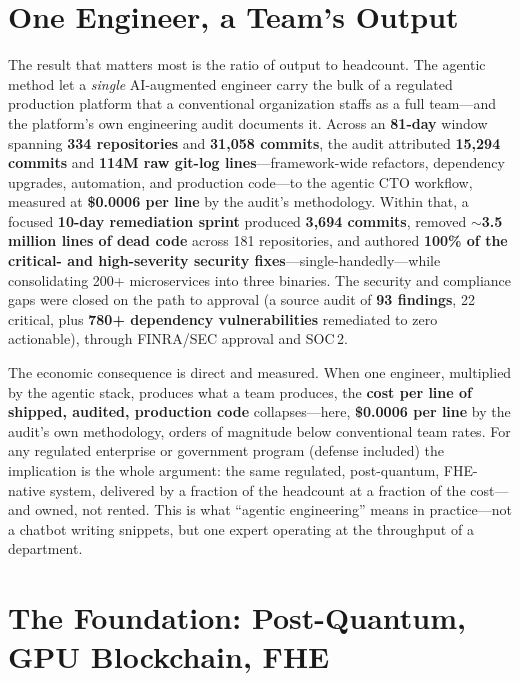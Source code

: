 \documentclass[11pt,letterpaper]{article}
\begin{document}
\section{One Engineer, a Team's Output}

The result that matters most is the ratio of output to headcount. The agentic method
let a \emph{single} AI-augmented engineer carry the bulk of a regulated production
platform that a conventional organization staffs as a full team---and the platform's
own engineering audit documents it. Across an \textbf{81-day} window spanning
\textbf{334 repositories} and \textbf{31{,}058 commits}, the audit attributed
\textbf{15{,}294 commits} and \textbf{114M raw git-log lines}---framework-wide refactors,
dependency upgrades, automation, and production code---to the agentic CTO workflow,
measured at \textbf{\$0.0006 per line} by the audit's methodology. Within that, a focused
\textbf{10-day remediation sprint} produced \textbf{3{,}694 commits}, removed
$\sim$\textbf{3.5 million lines of dead code} across 181 repositories, and authored
\textbf{100\% of the critical- and high-severity security fixes}---single-handedly---while
consolidating 200+ microservices into three binaries. The security and compliance gaps
were closed on the path to approval (a source audit of \textbf{93 findings}, 22 critical,
plus \textbf{780+ dependency vulnerabilities} remediated to zero actionable), through
FINRA/SEC approval and SOC\,2.

The economic consequence is direct and measured. When one engineer, multiplied by the
agentic stack, produces what a team produces, the \textbf{cost per line of shipped,
audited, production code} collapses---here, \textbf{\$0.0006 per line} by the audit's own
methodology, orders of magnitude below conventional team rates. For any
regulated enterprise or government program (defense included) the implication is
the whole argument:
the same regulated, post-quantum, FHE-native system, delivered by a fraction of the
headcount at a fraction of the cost---and owned, not rented. This is what ``agentic
engineering'' means in practice---not a chatbot writing snippets, but one expert
operating at the throughput of a department.

\section{The Foundation: Post-Quantum, GPU Blockchain, FHE}
\end{document}
